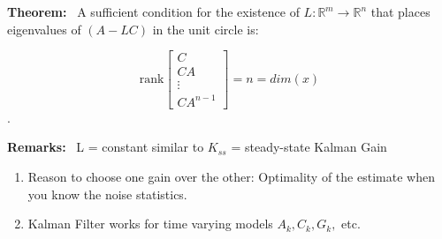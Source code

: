 \documentclass[letterpaper]{article}
\newcommand{\real}{\mathbb R}  %
\begin{document}
\textbf{Theorem:}~ A sufficient condition for the existence of $L:\real^m \rightarrow \real^n$ that places eigenvalues of $(A-LC)$ in the unit circle is:

$$\text{rank} \left[ \begin{array}{c} C \\ CA \\ \vdots \\ CA^{n-1} \end{array} \right] = n = dim(x)$$.

\textbf{Remarks:}~ L = constant similar to $K_{ss}$ = steady-state Kalman Gain
\begin{enumerate}
\item Reason to choose one gain over the other: Optimality of the estimate when you know the noise statistics.
\item Kalman Filter works for time varying models $A_k,C_k,G_k,$ etc.
\end{enumerate}
\end{document}
